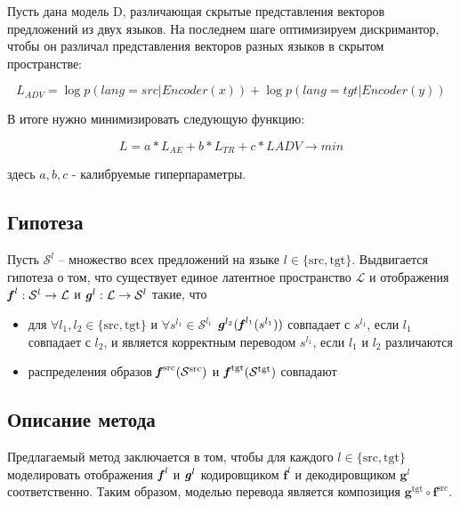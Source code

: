 \documentclass[12pt,twoside]{article}
\begin{document}
Пусть дана модель D, различающая скрытые представления векторов предложений из двух языков. На последнем шаге оптимизируем дискримантор, чтобы он различал представления векторов разных языков в скрытом пространстве:

$$L_{ADV} = \log p(lang = src| Encoder(x)) + \log p(lang = tgt|Encoder(y))$$

В итоге нужно минимизировать следующую функцию:

$$L = a*L_{AE} + b*L_{TR}+c*L{ADV} \longrightarrow min$$

здесь $a,b,c$ - калибруемые гиперпараметры.


\subsection{Гипотеза}
   Пусть $\mathcal{S}^{l}$ -- множество всех предложений на языке $l \in \{\text{src}, \text{tgt}\}$. Выдвигается гипотеза о том, что существует единое латентное пространство $\mathcal{L}$ и отображения $\textbf{\textit{f}}^{l}: \mathcal{S}^{l} \to \mathcal{L}$ и $\textbf{\textit{g}}^{l}: \mathcal{L} \to \mathcal{S}^{l}$ такие, что 
   \begin{itemize}
      \item для $\forall l_1, l_2 \in \{\text{src}, \text{tgt}\}$ и $\forall s^{l_1} \in \mathcal{S}^{l_1}$ $\textbf{\textit{g}}^{l_2}(\textbf{\textit{f}}^{l_1}(s^{l_1}))$ совпадает с $s^{l_1}$, если $l_1$ совпадает с $l_2$, и является корректным переводом $s^{l_1}$, если $l_1$ и $l_2$ различаются
      
      
      \item распределения образов $\textbf{\textit{f}}^{\text{src}}(\mathcal{S}^{\text{src}})$ и $\textbf{\textit{f}}^{\text{tgt}}(\mathcal{S}^{\text{tgt}})$ совпадают
   \end{itemize}

\subsection{Описание метода}
   Предлагаемый метод заключается в том, чтобы для каждого $l \in \{\text{src}, \text{tgt}\}$  моделировать отображения $\textbf{\textit{f}}^{l}$ и $\textbf{\textit{g}}^{l}$ кодировщиком $\textbf{f}^{l}$ и декодировщиком $\textbf{g}^{l}$ соответственно. Таким образом, моделью перевода является композиция $\textbf{g}^{\text{tgt}} \circ \textbf{f}^{\text{src}}$. 
   
\end{document}
